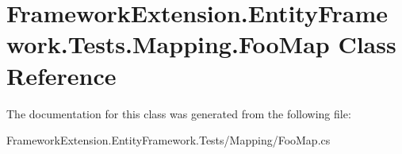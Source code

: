 \hypertarget{class_framework_extension_1_1_entity_framework_1_1_tests_1_1_mapping_1_1_foo_map}{\section{Framework\-Extension.\-Entity\-Framework.\-Tests.\-Mapping.\-Foo\-Map Class Reference}
\label{class_framework_extension_1_1_entity_framework_1_1_tests_1_1_mapping_1_1_foo_map}
}


The documentation for this class was generated from the following file\-:\begin{DoxyCompactItemize}
\item 
Framework\-Extension.\-Entity\-Framework.\-Tests/\-Mapping/Foo\-Map.\-cs\end{DoxyCompactItemize}
